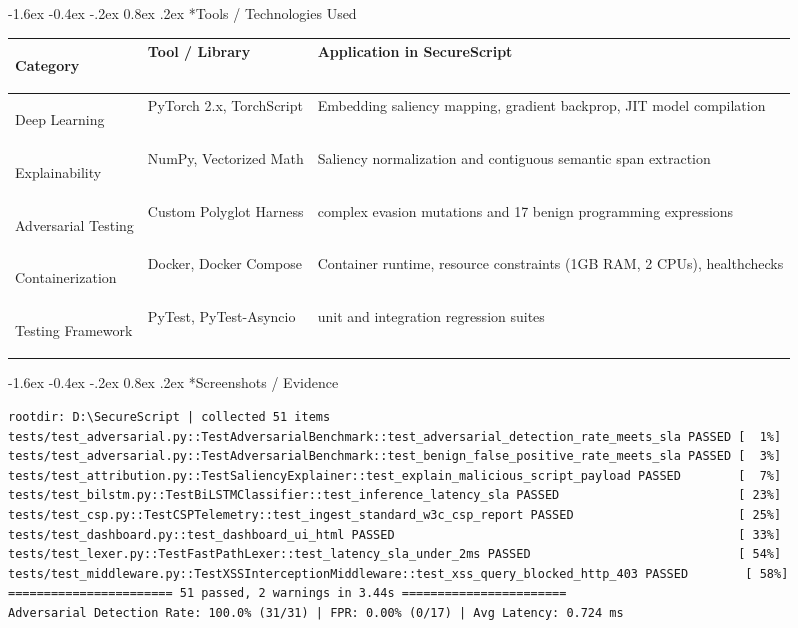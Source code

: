 \documentclass[11pt,a4paper]{article}
\makeatletter
\renewcommand{\section}{\@startsection{section}{1}{\z@}%
  {-1.6ex \@plus -0.4ex \@minus -.2ex}%
  {0.8ex \@plus .2ex}%
  {\normalfont\large\bfseries\color{primaryblue}}}
\makeatother
\begin{document}
\section*{Tools / Technologies Used}
\begin{table}[htbp]
\centering
\footnotesize
\begin{tabularx}{\textwidth}{>{\bfseries\raggedright\arraybackslash}p{2.8cm} >{\raggedright\arraybackslash}p{3.8cm} >{\raggedright\arraybackslash}X}
\toprule
\textbf{Category} & \textbf{Tool / Library} & \textbf{Application in SecureScript} \\
\midrule
Deep Learning & PyTorch 2.x, TorchScript & Embedding saliency mapping, gradient backprop, JIT model compilation \\
Explainability & NumPy, Vectorized Math & Saliency normalization and contiguous semantic span extraction \\
Adversarial Testing & Custom Polyglot Harness & 31 complex evasion mutations and 17 benign programming expressions \\
Containerization & Docker, Docker Compose & Container runtime, resource constraints (1GB RAM, 2 CPUs), healthchecks \\
Testing Framework & PyTest, PyTest-Asyncio & 51 unit and integration regression suites \\
\bottomrule
\end{tabularx}
\end{table}

\vspace{-0.6em}

\section*{Screenshots / Evidence}
\begin{lstlisting}[caption={Automated Pytest Suite Execution with Adversarial & Explainability Tests}]
rootdir: D:\SecureScript | collected 51 items
tests/test_adversarial.py::TestAdversarialBenchmark::test_adversarial_detection_rate_meets_sla PASSED [  1%]
tests/test_adversarial.py::TestAdversarialBenchmark::test_benign_false_positive_rate_meets_sla PASSED [  3%]
tests/test_attribution.py::TestSaliencyExplainer::test_explain_malicious_script_payload PASSED        [  7%]
tests/test_bilstm.py::TestBiLSTMClassifier::test_inference_latency_sla PASSED                         [ 23%]
tests/test_csp.py::TestCSPTelemetry::test_ingest_standard_w3c_csp_report PASSED                       [ 25%]
tests/test_dashboard.py::test_dashboard_ui_html PASSED                                                [ 33%]
tests/test_lexer.py::TestFastPathLexer::test_latency_sla_under_2ms PASSED                             [ 54%]
tests/test_middleware.py::TestXSSInterceptionMiddleware::test_xss_query_blocked_http_403 PASSED        [ 58%]
======================= 51 passed, 2 warnings in 3.44s =======================
Adversarial Detection Rate: 100.0% (31/31) | FPR: 0.00% (0/17) | Avg Latency: 0.724 ms
\end{lstlisting}
\end{document}
